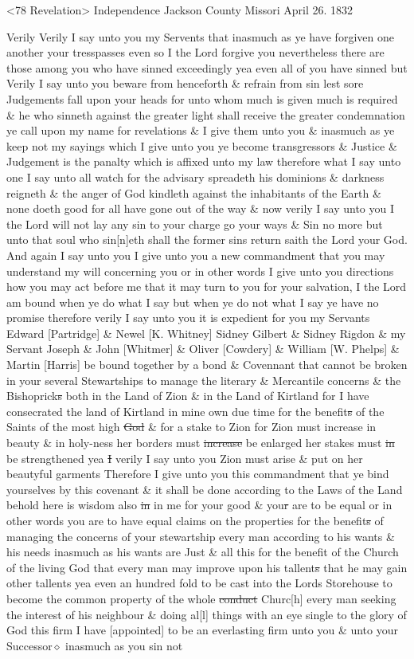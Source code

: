 				<78 Revelation> Independence Jackson County Missori April 26. 1832
				
				Verily Verily I say unto you my Servents that inasmuch as ye have forgiven one another your tresspasses even so I the Lord forgive you nevertheless there are those among you who have sinned exceedingly yea even all of you have sinned but Verily I say unto you beware from henceforth \& refrain from sin lest sore Judgements fall upon your heads for unto whom much is given much is required \& he who sinneth against the greater light shall receive the greater condemnation ye call upon my name for revelations \& I give them unto you \& inasmuch as ye keep not my sayings which I give unto you ye become transgressors \& Justice \& Judgement is the panalty which is affixed unto my law therefore what I say unto one I say unto all watch for the advisary spreadeth his dominions \& darkness reigneth \& the anger of God kindleth against the inhabitants of the Earth \& none doeth good for all have gone out of the way \& now verily I say unto you I the Lord will not lay any sin to your charge go your ways \& Sin no more but unto that soul who sin[n]eth shall the former sins return saith the Lord your God. And again I say unto you I give unto you a new commandment that you may understand my will concerning you or in other words I give unto you directions how you may act before me that it may turn to you for your salvation, I the Lord am bound when ye do what I say but when ye do not what I say ye have no promise therefore verily I say unto you it is expedient for you my Servants Edward [Partridge] \& Newel [K. Whitney] Sidney Gilbert \& Sidney Rigdon \& my Servant Joseph \& John [Whitmer] \& Oliver [Cowdery] \& William [W. Phelps] \& Martin [Harris] be bound together by a bond \& Covennant that cannot be broken in your several Stewartships to manage the literary \& Mercantile concerns \& the Bishoprick\sout{s} both in the Land of Zion \& in the Land of Kirtland for I have consecrated the land of Kirtland in mine own due time for the benefit\sout{s} of the Saints of the most high \sout{God} \& for a stake to Zion for Zion must increase in beauty \& in holy-ness her borders must \sout{increase} be enlarged her stakes must \sout{in} be strengthened yea \sout{I} verily I say unto you Zion must arise \& put on her beautyful garments Therefore I give unto you this commandment that ye bind yourselves by this covenant \& it shall be done according to the Laws of the Land behold here is wisdom also \sout{in} in me for your good \& you\sout{r} are to be equal or in other words you are to have equal claims on the properties for the benefit\sout{s} of managing the concerns of your stewartship every man according to his wants \& his needs inasmuch as his wants are Just \& all this for the benefit of the Church of the living God that every man may improve upon his tallent\sout{s} that he may gain other tallents yea even an hundred fold to be cast into the Lords Storehouse to become the common property of the whole \sout{conduct} Churc[h] every man seeking the interest of his neighbour \& doing al[l] things with an eye single to the glory of God this firm I have [appointed] to be an everlasting firm unto you \& unto your Successor$\diamond$ inasmuch as you sin not 